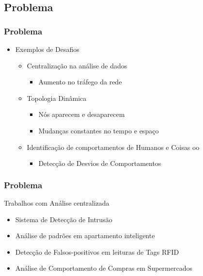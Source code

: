 \documentclass[hyperref={pdfpagelabels=false}]{beamer}
\begin{document}
\subsection{Problema}
 
\begin{frame}

	\frametitle{Problema}	

	\begin{itemize}
    	\item Exemplos de Desafios \cite{000-000} \begin{itemize} 
        	\item Centralização na análise de dados  \begin{itemize}
      	    	\item Aumento no tráfego da rede
			\end{itemize}
       		\item Topologia Dinâmica \begin{itemize}
          		\item Nós aparecem e desaparecem
               	\item Mudanças constantes no tempo e espaço
			\end{itemize}
        	\item Identificação de comportamentos de Humanos e Coisas oo \begin{itemize}
        		\item Detecção de Desvios de Comportamentos
        	\end{itemize}
        	\end{itemize}
	\end{itemize}
    
\end{frame}
 
\begin{frame}
	\frametitle{Problema}
    
    Trabalhos com Análise centralizada
    \linebreak
    \begin{itemize}
	    \item Sistema de Detecção de Intrusão \cite{004-000}
        \item Análise de padrões em apartamento inteligente \cite{009-038}
        \item Detecção de Falsos-positivos em leituras de Tags RFID \cite{000-015}
        \item Análise de Comportamento de Compras em Supermercados \cite{000-123}
        
    \end{itemize}
\end{frame} 
 
\end{document}
